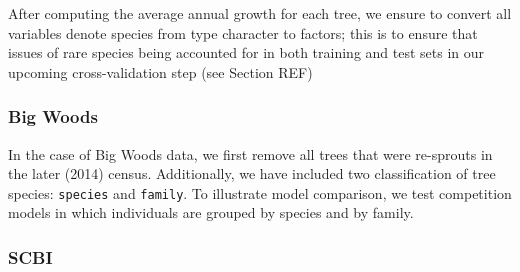 \documentclass[12pt]{article}
\newenvironment{Shaded}{\begin{snugshade}}{\end{snugshade}}
\newcommand{\CommentTok}[1]{\textcolor[rgb]{0.56,0.35,0.01}{\textit{#1}}}
\newcommand{\DataTypeTok}[1]{\textcolor[rgb]{0.13,0.29,0.53}{#1}}
\newcommand{\DecValTok}[1]{\textcolor[rgb]{0.00,0.00,0.81}{#1}}
\newcommand{\KeywordTok}[1]{\textcolor[rgb]{0.13,0.29,0.53}{\textbf{#1}}}
\newcommand{\NormalTok}[1]{#1}
\newcommand{\OperatorTok}[1]{\textcolor[rgb]{0.81,0.36,0.00}{\textbf{#1}}}
\newcommand{\StringTok}[1]{\textcolor[rgb]{0.31,0.60,0.02}{#1}}
\begin{document}
After computing the average annual growth for each tree, we ensure to
convert all variables denote species from type character to factors;
this is to ensure that issues of rare species being accounted for in
both training and test sets in our upcoming cross-validation step (see
Section REF)

\hypertarget{big-woods-1}{%
\subsubsection{Big Woods}\label{big-woods-1}}

In the case of Big Woods data, we first remove all trees that were
re-sprouts in the later (2014) census. Additionally, we have included
two classification of tree species: \texttt{species} and
\texttt{family}. To illustrate model comparison, we test competition
models in which individuals are grouped by species and by family.

\begin{Shaded}
\end{Shaded}

\hypertarget{scbi}{%
\subsubsection{SCBI}\label{scbi}}
\end{document}
